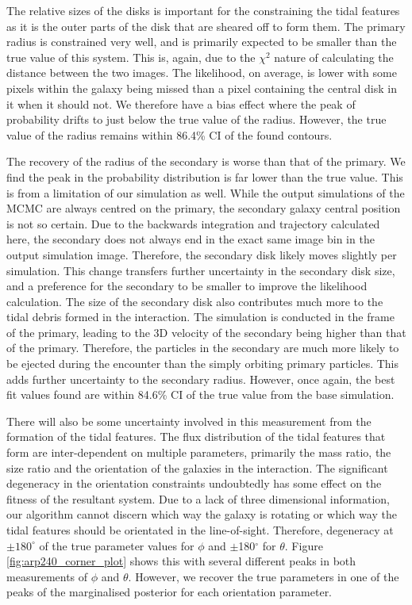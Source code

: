 The relative sizes of the disks is important for the constraining the tidal features as it is the outer parts of the disk that are sheared off to form them. The primary radius is constrained very well, and is primarily expected to be smaller than the true value of this system. This is, again, due to the $\chi^{2}$ nature of calculating the distance between the two images. The likelihood, on average, is lower with some pixels within the galaxy being missed than a pixel containing the central disk in it when it should not. We therefore have a bias effect where the peak of probability drifts to just below the true value of the radius. However, the true value of the radius remains within 86.4\% CI of the found contours. 

The recovery of the radius of the secondary is worse than that of the primary. We find the peak in the probability distribution is far lower than the true value. This is from a limitation of our simulation as well. While the output simulations of the MCMC are always centred on the primary, the secondary galaxy central position is not so certain. Due to the backwards integration and trajectory calculated here, the secondary does not always end in the exact same image bin in the output simulation image. Therefore, the secondary disk likely moves slightly per simulation. This change transfers further uncertainty in the secondary disk size, and a preference for the secondary to be smaller to improve the likelihood calculation. The size of the secondary disk also contributes much more to the tidal debris formed in the interaction. The simulation is conducted in the frame of the primary, leading to the 3D velocity of the secondary being higher than that of the primary. Therefore, the particles in the secondary are much more likely to be ejected during the encounter than the simply orbiting primary particles. This adds further uncertainty to the secondary radius. However, once again, the best fit values found are within 84.6\% CI of the true value from the base simulation. 

There will also be some uncertainty involved in this measurement from the formation of the tidal features. The flux distribution of the tidal features that form are inter-dependent on multiple parameters, primarily the mass ratio, the size ratio and the orientation of the galaxies in the interaction. The significant degeneracy in the orientation constraints undoubtedly has some effect on the fitness of the resultant system. Due to a lack of three dimensional information, our algorithm cannot discern which way the galaxy is rotating or which way the tidal features should be orientated in the line-of-sight. Therefore, degeneracy at $\pm180^{\circ}$ of the true parameter values for $\phi$ and $\pm$180$^{\circ}$ for $\theta$. Figure \ref{fig:arp240_corner_plot} shows this with several different peaks in both measurements of $\phi$ and $\theta$. However, we recover the true parameters in one of the peaks of the marginalised posterior for each orientation parameter.

